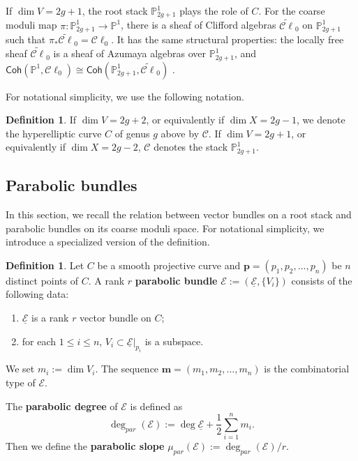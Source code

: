 \documentclass[12pt, letterpaper]{amsart}
\theoremstyle{definition}
\newtheorem{definition}[theorem]{Definition}
\newcommand{\PP}{\mathbb{P} }
\newcommand{\cC}{\mathcal{C} }
\newcommand{\cE}{\mathcal{E} }
\newcommand{\bp}{\mathbf{p} }
\newcommand{\bm}{\mathbf{m} }
\newcommand{\parmu}{\mu_{par}}
\newcommand{\pardeg}{\deg_{par}}
\begin{document}
If \(\dim V = 2g + 1\), the root stack \(\PP_{2g+1}^1\) plays the role of \(C\). For the coarse moduli map \(\pi : \PP_{2g+1}^1 \to \PP^1\), there is a sheaf of Clifford algebras \(\widetilde{\cC\ell}_0\) on \(\PP_{2g+1}^1\) such that \(\pi_*\widetilde{\cC\ell}_0 = \cC\ell_0\). It has the same structural properties: the locally free sheaf \(\widetilde{\cC\ell}_0\) is a sheaf of Azumaya algebras \cite[Proposition~3.15]{Kuz08} over \(\PP_{2g+1}^1\), and \(\mathsf{Coh}(\PP^1, \cC\ell_0) \cong \mathsf{Coh}(\PP_{2g+1}^1, \widetilde{\cC\ell}_0)\) \cite[Corollary~3.16]{Kuz08}.

For notational simplicity, we use the following notation.

\begin{definition}\label{def:curlyC}
If \(\dim V = 2g+2\), or equivalently if \(\dim X = 2g-1\), we denote the hyperelliptic curve \(C\) of genus \(g\) above by \(\cC\). If \(\dim V = 2g+1\), or equivalently if \(\dim X = 2g-2\), \(\cC\) denotes the stack \(\PP_{2g+1}^1\).
\end{definition}

\subsection{Parabolic bundles}\label{ssec:parabolicbundle}

In this section, we recall the relation between vector bundles on a root stack and parabolic bundles on its coarse moduli space. For notational simplicity, we introduce a specialized version of the definition.

\begin{definition}\label{def:parabolicbundle}
Let \(C\) be a smooth projective curve and \(\bp = (p_1, p_2, \dots, p_n)\) be \(n\) distinct points of \(C\). A rank \(r\) \textbf{parabolic bundle} \(\cE := (\underline{\cE}, \{V_i\})\) consists of the following data:
\begin{enumerate}
  \item \(\underline{\cE}\) is a rank \(r\) vector bundle on \(C\);
  \item for each \(1\le i \le n\), \(V_i \subset \underline{\cE}|_{p_i}\) is a subspace.
\end{enumerate}
We set \(m_i := \dim V_i\). The sequence \(\bm = (m_1, m_2, \dots, m_n)\) is the combinatorial type of \(\cE\).
\end{definition}

The \textbf{parabolic degree} of \(\cE\) is defined as
\[\pardeg (\cE) := \deg \underline{\cE} + \frac{1}{2}\sum_{i=1}^n m_i.\]
Then we define the \textbf{parabolic slope} \(\parmu (\cE) := \pardeg (\cE)/r\).
\end{document}
